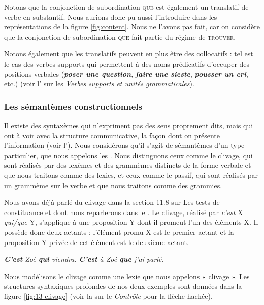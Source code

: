 Notons que la conjonction de subordination \textsc{que} est également un translatif de verbe en substantif. Nous aurions donc pu aussi l’introduire dans les représentations de la figure \ref{fig:content}. Nous ne l’avons pas fait, car on considère que la conjonction de subordination \textsc{que} fait partie du régime de \textsc{trouver}.

Notons également que les translatifs peuvent en plus être des collocatifs : tel est le cas des verbes supports qui permettent à des noms prédicatifs d’occuper des positions verbales (\textit{\textbf{poser une question}}, \textit{\textbf{faire une sieste}}, \textit{\textbf{pousser un cri}}, etc.) (voir l’ sur les \textit{Verbes supports et unités grammaticales}).

\subsubsection{Les sémantèmes constructionnels} 
Il existe des syntaxèmes qui n’expriment pas des sens proprement dits, mais qui ont à voir avec la structure communicative, la façon dont on présente l’information (voir l’). Nous considérons qu’il s’agit de sémantèmes d’un type particulier, que nous appelons les . Nous distinguons ceux comme le clivage, qui sont réalisés par des lexèmes et des grammèmes distincts de la forme verbale et que nous traitons comme des lexies, et ceux comme le passif, qui sont réalisés par un grammème sur le verbe et que nous traitons comme des grammies.

Nous avons déjà parlé du clivage dans la section 11.8 sur Les tests de constituance et dont nous reparlerons dans le . Le clivage, réalisé par \textit{c’est} X \textit{qui/que} Y, s’applique à une proposition Y dont il promeut l’un des éléments X. Il possède donc deux actants : l’élément promu X est le premier actant et la proposition Y privée de cet élément est le deuxième actant.

\ea\label{ex:13-clivage}
\ea \textit{\textbf{C’est} Zoé \textbf{qui} viendra.}
\ex \textit{\textbf{C’est} à Zoé \textbf{que} j’ai parlé.}\z\z

Nous modélisons le clivage comme une lexie que nous appelons « clivage ». Les structures syntaxiques profondes de nos deux exemples sont données dans la figure \ref{fig:13-clivage} (voir la  sur le \textit{Contrôle} pour la flèche hachée).

